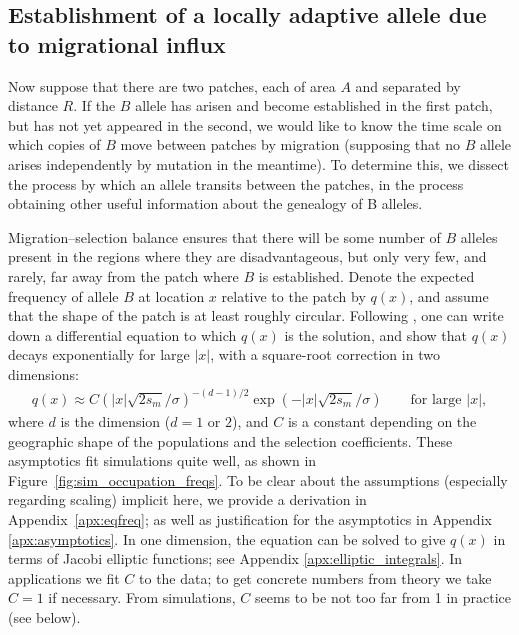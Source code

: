 \documentclass{article}
\begin{document}
\subsection{Establishment of a locally adaptive allele due to migrational influx}
\label{ss:patchymigration}

Now suppose that there are two patches, each of area $A$ and separated by distance $R$. 
If the $B$ allele has arisen and become established in the first patch, but has not yet appeared in the second,
we would like to know the time scale on which copies of $B$ move between patches by migration
(supposing that no $B$ allele arises independently by mutation in the meantime).
To determine this, we dissect the process by which an allele transits between the patches,
in the process obtaining other useful information about the genealogy of B alleles.

Migration--selection balance ensures that 
there will be some number of $B$ alleles present in the regions where they are disadvantageous,
but only very few, and rarely, far away from the patch where $B$ is established.
Denote the expected frequency of allele $B$ at location $x$ relative to the patch by $q(x)$,
and assume that the shape of the patch is at least roughly circular.
Following \citet{slatkin1973geneflow}, one can write down a differential equation to which $q(x)$ is the solution,
and show that $q(x)$ decays exponentially for large $|x|$,
with a square-root correction in two dimensions:
\begin{align} \label{eqn:eqfreq}
  q(x) \approx C \left( |x| \sqrt{2 s_m}/\sigma \right)^{-(d-1)/2} \exp( - |x| \sqrt{2 s_m} / \sigma) \qquad \text{for large $|x|$},
\end{align}
where $d$ is the dimension ($d=1$ or $2$), 
and $C$ is a constant depending on the geographic shape of the populations and the selection coefficients.
These asymptotics fit simulations quite well, as shown in Figure~\ref{fig:sim_occupation_freqs}.
To be clear about the assumptions (especially regarding scaling) implicit here,
we provide a derivation in Appendix~\ref{apx:eqfreq}; 
as well as justification for the asymptotics in Appendix \ref{apx:asymptotics}.
In one dimension, the equation can be solved to give $q(x)$ 
in terms of Jacobi elliptic functions; see Appendix \ref{apx:elliptic_integrals}.
In applications we fit $C$ to the data;
to get concrete numbers from theory we take $C=1$ if necessary.
From simulations, $C$ seems to be not too far from 1 in practice (see below).
\end{document}

